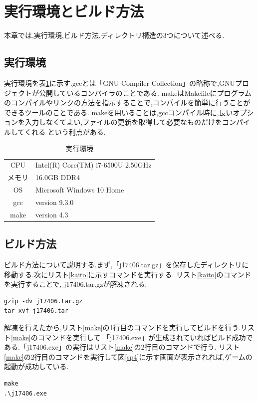 \documentclass[a4j]{jarticle}
\begin{document}
      \section{実行環境とビルド方法}
      本章では,実行環境,ビルド方法,ディレクトリ構造の3つについて述べる.
      \subsection{実行環境}
      実行環境を表\ref{env}に示す.gccとは「GNU Compiler Collection」の略称で,GNUプロジェクトが公開しているコンパイラのことである.
      makeはMakefileにプログラムのコンパイルやリンクの方法を指示することで,コンパイルを簡単に行うことができるツールのことである.
      makeを用いることは,gccコンパイル時に,長いオプションを入力しなくてよい,ファイルの更新を取得して必要なものだけをコンパイルしてくれる
      という利点がある.
      
      \begin{table}[H]
        \caption{実行環境}
      \label{env}
      \begin{center}
          \begin{tabular}{c|l}\hline
            CPU & Intel(R) Core(TM) i7-6500U 2.50GHz  \\ 
            メモリ & 16.0GB DDR4 \\
            OS & Microsoft Windows 10 Home \\
            gcc &  version 9.3.0 \\
            make & version 4.3 \\ \hline
          \end{tabular}
      \end{center}
      \end{table}
      
      \subsection{ビルド方法}
      ビルド方法について説明する.まず,「j17406.tar.gz」を保存したディレクトリに移動する.次にリスト\ref{kaito}に示すコマンドを実行する.
      リスト\ref{kaito}のコマンドを実行することで, j17406.tar.gzが解凍される.
      \begin{lstlisting}[basicstyle=\ttfamily\footnotesize, frame=single,label=kaito,caption=j17406.tar.gzの解凍]
gzip -dv j17406.tar.gz
tar xvf j17406.tar
        \end{lstlisting}

        解凍を行えたから,リスト\ref{make}の1行目のコマンドを実行してビルドを行う.リスト\ref{make}のコマンドを実行して
        「j17406.exe」が生成されていればビルド成功である.「j17406.exe」の実行はリスト\ref{make}の2行目のコマンドで行う.
        リスト\ref{make}の2行目のコマンドを実行して図\ref{sp4}に示す画面が表示されれば,ゲームの起動が成功している.
        \begin{lstlisting}[basicstyle=\ttfamily\footnotesize, frame=single,label=make,caption=makeコマンド]
make
.\j17406.exe
        \end{lstlisting}  
\end{document}
